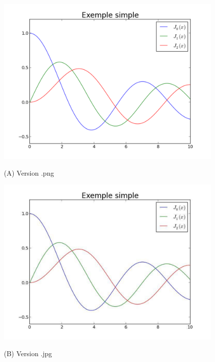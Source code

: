 \begin{figure}[h]
\begin{minipage}[b]{0.33\linewidth}
  \centering
 \centerline{\includegraphics[width=1.\textwidth]{example_simple_png}}
  \vspace{0.1cm}
  \centerline{(A) Version .png}\medskip
\end{minipage}
\hfill
\begin{minipage}[b]{.33\linewidth}
  \centering
 \centerline{\includegraphics[width=1.\textwidth]{example_simple_jpg}}
  \vspace{0.1cm}
  \centerline{(B) Version .jpg}\medskip
\end{minipage}%
\hfill
\begin{minipage}[b]{.33\linewidth}

\end{minipage}
\end{figure}

